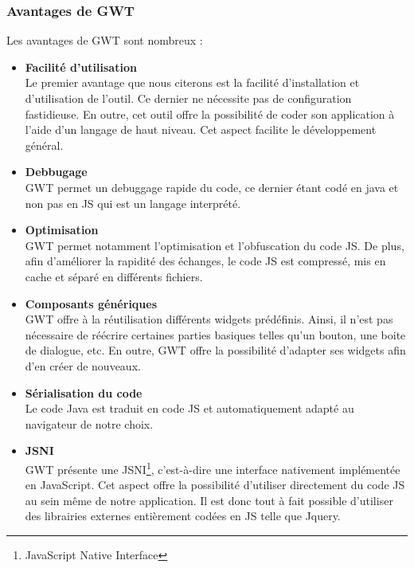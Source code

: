 \subsubsection{Avantages de GWT}

Les avantages de GWT sont nombreux :  \\
\begin{itemize}
\item \textbf{Facilité d'utilisation}\\
Le premier avantage que nous citerons est la facilité d'installation et d'utilisation de l'outil. Ce dernier ne nécessite pas de configuration fastidieuse. En outre, cet outil offre la possibilité de coder son application à l'aide d'un langage de haut niveau. Cet aspect facilite le développement général.\\

\item \textbf{Debbugage}\\
GWT permet un debuggage rapide du code, ce dernier étant codé en java et non pas en JS qui est un langage interprété.\\

\item \textbf{Optimisation}\\
GWT permet notamment l'optimisation et l'obfuscation du code JS. De plus, afin d'améliorer la rapidité des échanges, le code JS est compressé, mis en cache et séparé en différents fichiers.\\

\item \textbf{Composants génériques}\\
GWT offre à la réutilisation différents widgets prédéfinis. Ainsi, il n'est pas nécessaire de réécrire certaines parties basiques telles qu'un bouton, une boite de dialogue, etc.  En outre, GWT offre la possibilité d'adapter ses widgets afin d'en créer de nouveaux.\\

\item \textbf{Sérialisation du code}\\
Le code Java est traduit en code JS et automatiquement adapté au navigateur de notre choix.\\

\item \textbf{JSNI}\\
GWT présente une JSNI\footnote{JavaScript Native Interface}, c'est-à-dire une interface nativement implémentée en JavaScript. Cet aspect offre la possibilité d'utiliser directement du code JS au sein même de notre application. Il est donc tout à fait possible d'utiliser des librairies externes entièrement codées en JS telle que Jquery.\\


\end{itemize}
